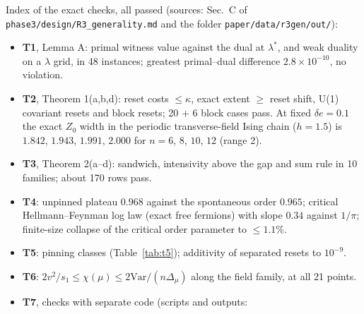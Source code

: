 \documentclass[aps,prx,onecolumn,10pt,nofootinbib,longbibliography,floatfix]{revtex4-2}
\theoremstyle{remark}
\newcommand{\de}{\delta e}
\begin{document}
Index of the exact checks, all passed (sources: Sec.~C of \texttt{phase3/design/R3\_generality.md} and the %
folder \texttt{paper/data/r3gen/out/}): %
\begin{itemize}
\item \textbf{T1}, Lemma A: primal witness value against the dual at $\lambda^*$, and weak duality on a $\lambda$ grid, in %
48 instances; greatest primal--dual difference $2.8\times10^{-10}$, no violation. %
\item \textbf{T2}, Theorem 1(a,b,d): reset costs $\le\kappa$, exact extent $\ge$ reset shift, U(1) covariant resets and %
block resets; 20 + 6 block cases pass. At fixed $\de=0.1$ the exact $Z_0$ width in the periodic transverse-field Ising chain %
($h=1.5$) is $1.842$, $1.943$, $1.991$, $2.000$ for $n=6$, $8$, $10$, $12$ (range 2). %
\item \textbf{T3}, Theorem 2(a--d): sandwich, intensivity above the gap and sum rule in 10 families; about 170 rows pass. %
\item \textbf{T4}: unpinned plateau $0.968$ against the spontaneous order $0.965$; critical Hellmann--Feynman log law %
(exact free fermions) with slope $0.34$ against $1/\pi$; finite-size collapse of the critical order parameter to %
$\le1.1\%$. %
\item \textbf{T5}: pinning classes (Table~\ref{tab:t5}); additivity of separated resets to $10^{-9}$. %
\item \textbf{T6}: $2v^2/s_1\le\chi(\mu)\le2\mathrm{Var}/(n\Delta_\mu)$ along the field family, at all 21 points. %
\item \textbf{T7}, checks with separate code (scripts and outputs:

\end{itemize}
\end{document}
